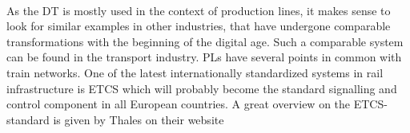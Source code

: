 \\
As the \ac{DT} is mostly used in the context of production lines, it makes sense to look for similar examples in other industries, that have undergone comparable transformations with the beginning of the digital age.
Such a comparable system can be found in the transport industry. 
\acp{PL} have several points in common with train networks.
One of the latest internationally standardized systems in rail infrastructure is \ac{ETCS} which will probably become the standard signalling and control component in all European countries. 
A great overview on the \ac{ETCS}-standard is given by Thales on their website \cite{ThalesETCS}

























